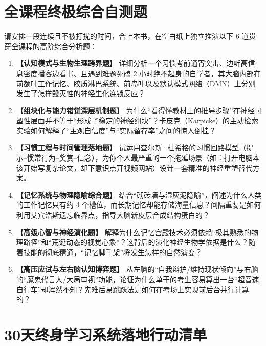 \documentclass[12pt,a4paper,openany]{ctexbook}
\begin{document}
\section{全课程终极综合自测题}

请安排一段连续且不被打扰的时间，合上本书，在空白纸上独立推演以下 6 道贯穿全课程的高阶综合分析题：

\begin{enumerate}
    \item \textbf{【认知模式与生物生理跨界题】} 
    详细分析一个习惯考前通宵突击、边听高信息密度播客边看书、且遇到难题死磕 2 小时绝不起身的自学者，其大脑内部在前额叶工作记忆、胶质淋巴系统、前岛叶以及默认模式网络（DMN）上分别发生了怎样毁灭性的神经生化连锁反应？
    
    \item \textbf{【组块化与能力错觉深层机制题】} 
    为什么“看得懂教材上的推导步骤”在神经可塑性层面并不等于“形成了稳定的神经组块”？卡皮克（Karpicke）的主动检索实验如何解释了“主观自信度”与“实际留存率”之间的惊人倒挂？
    
    \item \textbf{【习惯工程与时间管理落地题】} 
    试运用查尔斯·杜希格的习惯回路模型（提示--惯常行为--奖赏--信念），为你个人最严重的一个拖延场景（如：打开电脑本该开始写复杂论文，却下意识点开视频网站）设计一套精准的神经重塑替代方案。
    
    \item \textbf{【记忆系统与物理隐喻综合题】} 
    结合“砌砖墙与湿灰泥隐喻”，阐述为什么人类的工作记忆只有约 4 个槽位，而长期记忆却能存储海量信息？间隔重复是如何利用艾宾浩斯遗忘临界点，指导大脑新皮层合成结构蛋白的？
    
    \item \textbf{【高级心智与神经演化题】} 
    解释为什么记忆宫殿技术必须依赖“极其熟悉的物理路径”和“荒诞动态的视觉心象”？这背后的演化神经生物学依据是什么？随着技能的彻底精通，“记忆脚手架”将发生怎样的自然演变？
    
    \item \textbf{【高压应试与左右脑认知博弈题】} 
    从左脑的“自我辩护/维持现状倾向”与右脑的“魔鬼代言人/大局审视”功能，论证为什么单干的考生容易算出一台“超音速自行车”却浑然不知？先难后易跳跃法是如何在考场上实现前后台并行计算的？
\end{enumerate}

\section{30天终身学习系统落地行动清单}
\end{document}
